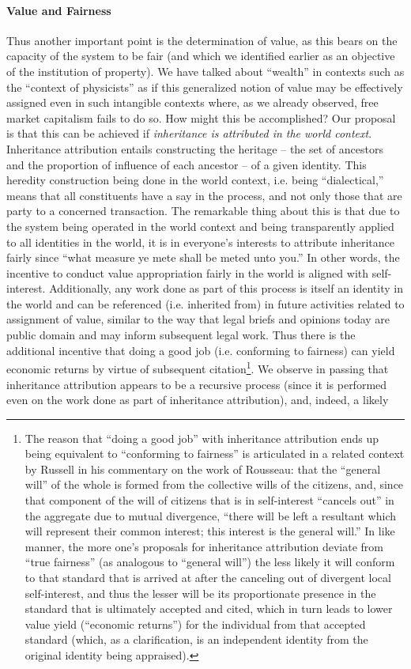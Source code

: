 \documentclass[pra,twocolumn,groupedaddress,10pt]{revtex4}
\theoremstyle{definition}
\begin{document}
\paragraph{Value and Fairness} Thus another important point is the determination of value, as this bears on the capacity of the system to be fair (and which we identified earlier as an objective of the institution of property). We have talked about ``wealth'' in contexts such as the ``context of physicists'' as if this generalized notion of value may be effectively assigned even in such intangible contexts where, as we already observed, free market capitalism fails to do so. How might this be accomplished? Our proposal is that this can be achieved if \textit{inheritance is attributed in the world context}. Inheritance attribution entails constructing the heritage -- the set of ancestors and the proportion of influence of each ancestor -- of a given identity. This heredity construction being done in the world context, i.e. being ``dialectical,'' means that all constituents have a say in the process, and not only those that are party to a concerned transaction. The remarkable thing about this is that due to the system being operated in the world context and being transparently applied to all identities in the world, it is in everyone's interests to attribute inheritance fairly since ``what measure ye mete shall be meted unto you.'' In other words, the incentive to conduct value appropriation fairly in the world is aligned with self-interest. Additionally, any work done as part of this process is itself an identity in the world and can be referenced (i.e. inherited from) in future activities related to assignment of value, similar to the way that legal briefs and opinions today are public domain and may inform subsequent legal work. Thus there is the additional incentive that doing a good job (i.e. conforming to fairness) can yield economic returns by virtue of subsequent citation\footnote{The reason that ``doing a good job'' with inheritance attribution ends up being equivalent to ``conforming to fairness'' is articulated in a related context by Russell\cite{russell} in his commentary on the work of Rousseau\cite{rousseau}: that the ``general will'' of the whole is formed from the collective wills of the citizens, and, since that component of the will of citizens that is in self-interest ``cancels out'' in the aggregate due to mutual divergence, ``there will be left a resultant which will represent their common interest; this interest is the general will.'' In like manner, the more one's proposals for inheritance attribution deviate from ``true fairness'' (as analogous to ``general will'') the less likely it will conform to that standard that is arrived at after the canceling out of divergent local self-interest, and thus the lesser will be its proportionate presence in the standard that is ultimately accepted and cited, which in turn leads to lower value yield (``economic returns'') for the individual from that accepted standard (which, as a clarification, is an independent identity from the original identity being appraised).}. We observe in passing that inheritance attribution appears to be a recursive process (since it is performed even on the work done as part of inheritance attribution), and, indeed, a likely 
\end{document}
